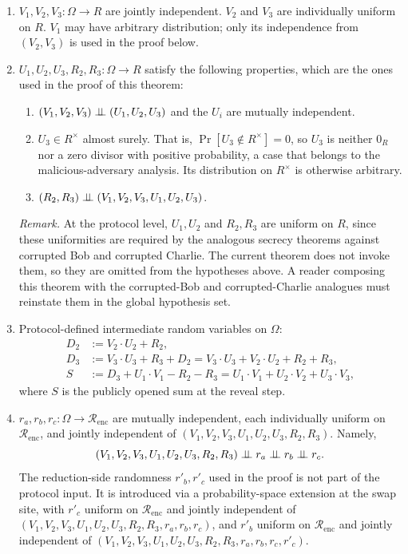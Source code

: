 \documentclass[11pt]{article}
\newcommand{\indep}{\mathrel{\perp\mkern-9mu\perp}}
\newcommand{\Renc}{\mathcal{R}_{\mathrm{enc}}}
\begin{document}
\begin{enumerate}
\item $V_1, V_2, V_3 : \Omega \to R$ are jointly independent. $V_2$ and $V_3$ are individually uniform on $R$. $V_1$ may have arbitrary distribution; only its independence from $(V_2, V_3)$ is used in the proof below.

\item $U_1, U_2, U_3, R_2, R_3 : \Omega \to R$ satisfy the following properties, which are the ones used in the proof of this theorem:
  \begin{enumerate}[label=2.\arabic*.]
  \item $(V_1, V_2, V_3) \indep (U_1, U_2, U_3)$ and the $U_i$ are mutually independent.
  \item $U_3 \in R^\times$ almost surely. That is, $\Pr[U_3 \notin R^\times] = 0$, so $U_3$ is neither $0_R$ nor a zero divisor with positive probability, a case that belongs to the malicious-adversary analysis. Its distribution on $R^\times$ is otherwise arbitrary.
  \item $(R_2, R_3) \indep (V_1, V_2, V_3, U_1, U_2, U_3)$.
  \end{enumerate}

  \textit{Remark.} At the protocol level, $U_1, U_2$ and $R_2, R_3$ are uniform on $R$, since these uniformities are required by the analogous secrecy theorems against corrupted Bob and corrupted Charlie. The current theorem does not invoke them, so they are omitted from the hypotheses above. A reader composing this theorem with the corrupted-Bob and corrupted-Charlie analogues must reinstate them in the global hypothesis set.

\item Protocol-defined intermediate random variables on $\Omega$:
\begin{align*}
D_2 &:= V_2 \cdot U_2 + R_2, \\
D_3 &:= V_3 \cdot U_3 + R_3 + D_2 = V_3 \cdot U_3 + V_2 \cdot U_2 + R_2 + R_3, \\
S   &:= D_3 + U_1 \cdot V_1 - R_2 - R_3 = U_1 \cdot V_1 + U_2 \cdot V_2 + U_3 \cdot V_3,
\end{align*}
where $S$ is the publicly opened sum at the reveal step.

\item $r_a, r_b, r_c : \Omega \to \Renc$ are mutually independent, each individually uniform on $\Renc$, and jointly independent of $(V_1, V_2, V_3, U_1, U_2, U_3, R_2, R_3)$. Namely,
\[
(V_1, V_2, V_3, U_1, U_2, U_3, R_2, R_3) \indep r_a \indep r_b \indep r_c.
\]
The reduction-side randomness $r'_b, r'_c$ used in the proof is not part of the protocol input. It is introduced via a probability-space extension at the swap site, with $r'_c$ uniform on $\Renc$ and jointly independent of $(V_1,V_2,V_3,U_1,U_2,U_3,R_2,R_3,r_a,r_b,r_c)$, and $r'_b$ uniform on $\Renc$ and jointly independent of $(V_1,V_2,V_3,U_1,U_2,U_3,R_2,R_3,r_a,r_b,r_c,r'_c)$.


\end{enumerate}
\end{document}
